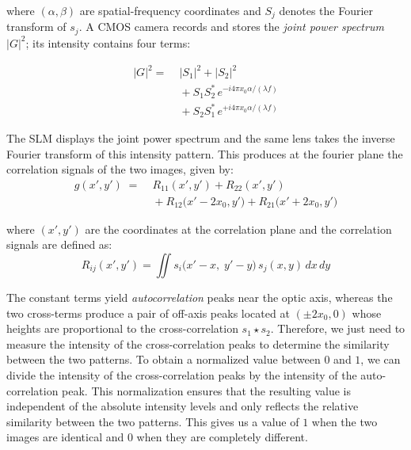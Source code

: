 \documentclass[twocolumn]{article} %
\begin{document}
where \((\alpha,\beta)\) are spatial-frequency coordinates and
\(S_{j}\) denotes the Fourier transform of \(s_{j}\).
A CMOS camera records and stores the \emph{joint power spectrum}
\(|G|^{2}\); its intensity contains four terms:

\begin{equation}
\begin{aligned}
|G|^{2} =\;& |S_{1}|^{2} + |S_{2}|^{2} \\[2pt]
          & {}+ S_{1}S_{2}^{\!*}\,
               e^{-i4\pi x_{0}\alpha/(\lambda f)} \\[2pt]
          & {}+ S_{2}S_{1}^{\!*}\,
               e^{+i4\pi x_{0}\alpha/(\lambda f)}
\end{aligned}
\label{eq:jps-components}
\end{equation}

The SLM displays the joint power spectrum and the same lens takes the inverse Fourier transform of this intensity
pattern. This produces at the fourier plane the correlation signals of the two images, given by:
\begin{equation}
\begin{aligned}
g(x',y') \;=\;& R_{11}(x',y') + R_{22}(x',y') \\[2pt]
              &{}+ R_{12}\!\bigl(x' - 2x_{0},y'\bigr)
              + R_{21}\!\bigl(x' + 2x_{0},y'\bigr)
\end{aligned}
\label{eq:correlation-signals}
\end{equation}

where $(x', y')$ are the coordinates at the correlation plane and the correlation signals are defined as:
\begin{equation}
  R_{ij}(x',y') =
  \iint s_i\bigl(x' - x,\; y' - y\bigr)\,
        s_j(x,y)\,dx\,dy
  \label{eq:rij}
\end{equation}

The constant terms yield \emph{autocorrelation}
peaks near the optic axis, whereas the two cross-terms produce a pair
of off-axis peaks located at \((\pm2x_{0},0)\) whose heights are
proportional to the cross-correlation
\(s_{1}\star s_{2}\).
Therefore, we just need to measure the intensity of the cross-correlation peaks to determine the similarity between the two patterns. To obtain a normalized value between $0$ and $1$, we can divide the intensity of the cross-correlation peaks by the intensity of the auto-correlation peak. This normalization ensures that the resulting value is independent of the absolute intensity levels and only reflects the relative similarity between the two patterns.
This gives us a value of $1$ when the two images are identical and $0$ when they are completely different.
\end{document}
